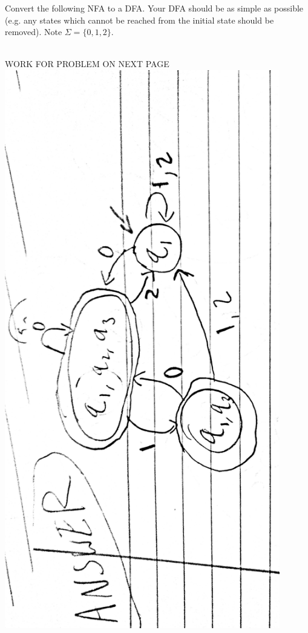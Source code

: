 \documentclass[11pt]{article}
\theoremstyle{definition}
\theoremstyle{theorem}
\newcommand{\solution}{\medskip\noindent{\color{blue}\textbf{Solution:}}}
\begin{document}
Convert the following NFA to a DFA. Your DFA should be as simple as possible (e.g. any states which cannot be reached from the initial state should be removed). Note $\Sigma = \{0,1,2\}$.


\solution
\\WORK FOR PROBLEM ON NEXT PAGE 
\includegraphics[angle=-90,origin=c, scale=0.11, width= 12cm]{./p1_images/ans.jpg}
\end{document}
